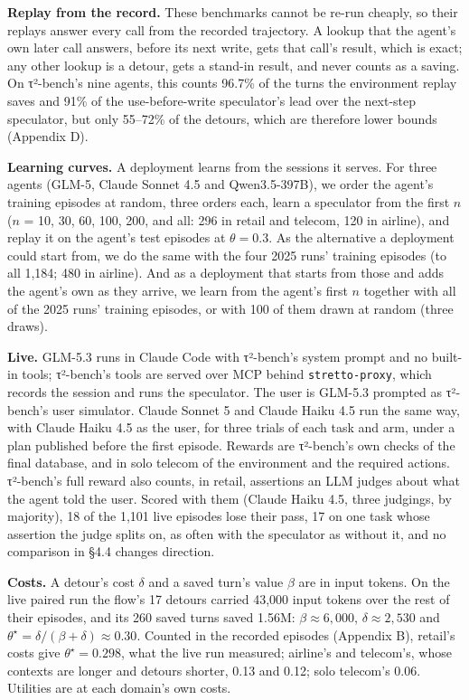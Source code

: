 \documentclass[10pt,twocolumn,letterpaper]{article}
\newcommand{\runin}[1]{{\sffamily\bfseries\color{accent}#1}}
\begin{document}
\runin{Replay from the record.} These benchmarks cannot be re-run cheaply, so their replays answer every call from the recorded trajectory. A lookup that the agent's own later call answers, before its next write, gets that call's result, which is exact; any other lookup is a detour, gets a stand-in result, and never counts as a saving. On τ²-bench's nine agents, this counts 96.7\% of the turns the environment replay saves and 91\% of the use-before-write speculator's lead over the next-step speculator, but only 55--72\% of the detours, which are therefore lower bounds (Appendix D).

\runin{Learning curves.} A deployment learns from the sessions it serves. For three agents (GLM-5, Claude Sonnet 4.5 and Qwen3.5-397B), we order the agent's training episodes at random, three orders each, learn a speculator from the first \(n\) (\(n\) = 10, 30, 60, 100, 200, and all: 296 in retail and telecom, 120 in airline), and replay it on the agent's test episodes at \(\theta = 0.3\). As the alternative a deployment could start from, we do the same with the four 2025 runs' training episodes (to all 1,184; 480 in airline). And as a deployment that starts from those and adds the agent's own as they arrive, we learn from the agent's first \(n\) together with all of the 2025 runs' training episodes, or with 100 of them drawn at random (three draws).

\runin{Live.} GLM-5.3 runs in Claude Code with τ²-bench's system prompt and no built-in tools; τ²-bench's tools are served over MCP behind \texttt{stretto-proxy}, which records the session and runs the speculator. The user is GLM-5.3 prompted as τ²-bench's user simulator. Claude Sonnet 5 and Claude Haiku 4.5 run the same way, with Claude Haiku 4.5 as the user, for three trials of each task and arm, under a plan published before the first episode. Rewards are τ²-bench's own checks of the final database, and in solo telecom of the environment and the required actions. τ²-bench's full reward also counts, in retail, assertions an LLM judges about what the agent told the user. Scored with them (Claude Haiku 4.5, three judgings, by majority), 18 of the 1,101 live episodes lose their pass, 17 on one task whose assertion the judge splits on, as often with the speculator as without it, and no comparison in §4.4 changes direction.

\runin{Costs.} A detour's cost \(\delta\) and a saved turn's value \(\beta\) are in input tokens. On the live paired run the flow's 17 detours carried 43,000 input tokens over the rest of their episodes, and its 260 saved turns saved 1.56M: \(\beta \approx 6{,}000\), \(\delta \approx 2{,}530\) and \(\theta^\star = \delta/(\beta+\delta) \approx 0.30\). Counted in the recorded episodes (Appendix B), retail's costs give \(\theta^\star = 0.298\), what the live run measured; airline's and telecom's, whose contexts are longer and detours shorter, 0.13 and 0.12; solo telecom's 0.06. Utilities are at each domain's own costs.
\end{document}
